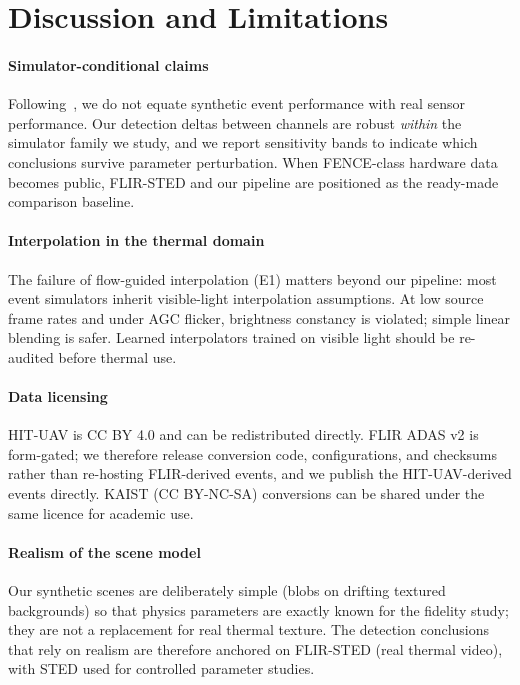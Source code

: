 \section{Discussion and Limitations}
\label{sec:discussion}

\paragraph{Simulator-conditional claims}
Following~\cite{stoffregen2020sim2real}, we do not equate synthetic event
performance with real sensor performance. Our detection deltas between
channels are robust \emph{within} the simulator family we study, and we
report sensitivity bands to indicate which conclusions survive parameter
perturbation. When FENCE-class hardware data becomes public, FLIR-STED and
our pipeline are positioned as the ready-made comparison baseline.

\paragraph{Interpolation in the thermal domain}
The failure of flow-guided interpolation (E1) matters beyond our pipeline:
most event simulators inherit visible-light interpolation assumptions. At
low source frame rates and under AGC flicker, brightness constancy is
violated; simple linear blending is safer. Learned interpolators trained on
visible light should be re-audited before thermal use.

\paragraph{Data licensing}
HIT-UAV is CC BY 4.0 and can be redistributed directly. FLIR ADAS v2 is
form-gated; we therefore release conversion code, configurations, and
checksums rather than re-hosting FLIR-derived events, and we publish the
HIT-UAV-derived events directly. KAIST (CC BY-NC-SA) conversions can be
shared under the same licence for academic use.

\paragraph{Realism of the scene model}
Our synthetic scenes are deliberately simple (blobs on drifting textured
backgrounds) so that physics parameters are exactly known for the fidelity
study; they are not a replacement for real thermal texture. The detection
conclusions that rely on realism are therefore anchored on FLIR-STED
(real thermal video), with STED used for controlled parameter studies.

